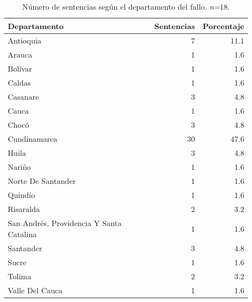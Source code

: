 \begin{table}[!htbp]
\centering
\caption{Número de sentencias según el departamento del fallo. \textit{n=}18.} 
\label{tab:depfal}
\begin{tabular}{lrr}
  \hline
Departamento & Sentencias & Porcentaje \\ 
  \hline
Antioquia &  7 & 11.1 \\ 
  Arauca &  1 & 1.6 \\ 
  Bolívar &  1 & 1.6 \\ 
  Caldas &  1 & 1.6 \\ 
  Casanare &  3 & 4.8 \\ 
  Cauca &  1 & 1.6 \\ 
  Chocó &  3 & 4.8 \\ 
  Cundinamarca & 30 & 47.6 \\ 
  Huila &  3 & 4.8 \\ 
  Nariño &  1 & 1.6 \\ 
  Norte De Santander &  1 & 1.6 \\ 
  Quindío &  1 & 1.6 \\ 
  Risaralda &  2 & 3.2 \\ 
  San Andrés, Providencia Y Santa Catalina &  1 & 1.6 \\ 
  Santander &  3 & 4.8 \\ 
  Sucre &  1 & 1.6 \\ 
  Tolima &  2 & 3.2 \\ 
  Valle Del Cauca &  1 & 1.6 \\ 
   \hline
\end{tabular}
\end{table}
